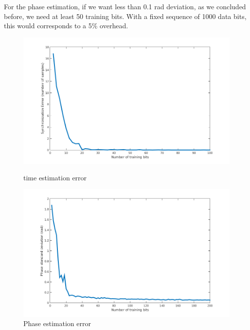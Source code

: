 \documentclass[a4paper,12pt]{article}
\begin{document}
For the phase estimation, if we want less than 0.1 rad deviation, as we concluded before, we need at least 50 training bits. With a fixed sequence of 1000 data bits, this would corresponds to a 5\% overhead.

\begin{figure}[ht]
\begin{minipage}[c]{.45\linewidth}
\begin{center}
\includegraphics[scale=0.35]{Training_sync.png}
\caption{time estimation error}
\label{TSE}
\end{center}
\end{minipage}
\hfill
\begin{minipage}[c]{.45\linewidth}
\begin{center}
\includegraphics[scale=0.35]{Training_phase.png}
\caption{Phase estimation error}
\label{TPE}
\end{center}
\end{minipage}
\end{figure}
\end{document}
